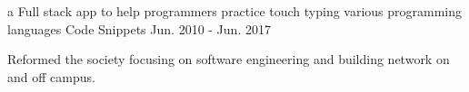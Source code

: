 

\begin{cventries}

  \cventry
    {a Full stack app to help programmers practice touch typing various programming languages} %
    {Code Snippets} %
    {} %
    {Jun. 2010 - Jun. 2017} %
    {
      \begin{cvitems} %
        \item {Reformed the society focusing on software engineering and building network on and off campus.}
      \end{cvitems}
    }

\end{cventries}
